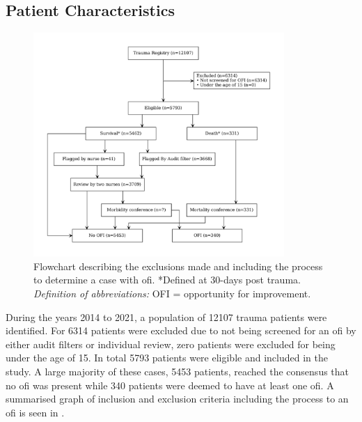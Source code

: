 \documentclass[12pt, letterpaper]{article}
\begin{document}
\subsection{Patient Characteristics}
\begin{figure}[t]
    \centering
    \includegraphics[width=0.85\textwidth]{figures/flowchart.pdf}
    \caption{Flowchart describing the exclusions made and including the process to determine a case with \acrshort{ofi}. *Defined at 30-days post trauma. \\
        \textit{Definition of abbreviations:} OFI = opportunity for improvement.}
    \label{fig:flowchart}
\end{figure}
During the years 2014 to 2021, a population of \num{12107} trauma patients were identified. For \num{6314} patients were excluded due to not being screened for an \acrshort{ofi} by either audit filters or individual review, zero patients were excluded for being under the age of 15. In total \num{5793} patients were eligible and included in the study. A large majority of these cases, \num{5453} patients, reached the consensus that no \acrshort{ofi} was present while \num{340} patients were deemed to have at least one \acrshort{ofi}. A summarised graph of inclusion and exclusion criteria including the process to an \acrshort{ofi} is seen in .
\end{document}
